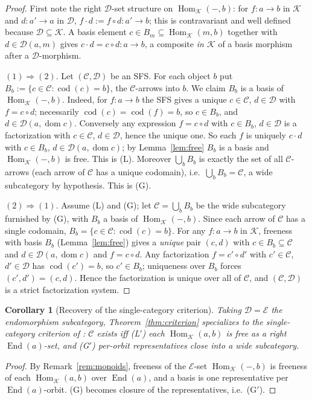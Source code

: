 \documentclass[11pt]{article}
\newtheorem{corollary}[theorem]{Corollary}
\theoremstyle{definition}
\newcommand{\Hom}{\operatorname{Hom}}
\newcommand{\End}{\operatorname{End}}
\newcommand{\C}{\mathcal{C}}
\newcommand{\D}{\mathcal{D}}
\newcommand{\K}{\mathcal{K}}
\newcommand{\E}{\mathcal{E}}
\newcommand{\dom}{\operatorname{dom}}
\newcommand{\cod}{\operatorname{cod}}
\begin{document}
\begin{proof}
First note the right $\D$-set structure on $\Hom_\K(-,b)$: for $f:a\to b$ in $\K$
and $d:a'\to a$ in $\D$, $f\cdot d:=f\circ d:a'\to b$; this is contravariant and
well defined because $\D\subseteq\K$. A basis element $c\in B_m\subseteq
\Hom_\K(m,b)$ together with $d\in\D(a,m)$ gives $c\cdot d=c\circ d:a\to b$, a
composite \emph{in $\K$} of a basis morphism after a $\D$-morphism.

$(1)\Rightarrow(2)$. Let $(\C,\D)$ be an SFS. For each object $b$ put
$B_b:=\{c\in\C:\cod(c)=b\}$, the $\C$-arrows into $b$. We claim $B_b$ is a basis of
$\Hom_\K(-,b)$. Indeed, for $f:a\to b$ the SFS gives a unique $c\in\C$, $d\in\D$
with $f=c\circ d$; necessarily $\cod(c)=\cod(f)=b$, so $c\in B_b$, and
$d\in\D(a,\dom c)$. Conversely any expression $f=c\circ d$ with $c\in B_b$,
$d\in\D$ is a factorization with $c\in\C$, $d\in\D$, hence the unique one. So each
$f$ is uniquely $c\cdot d$ with $c\in B_b$, $d\in\D(a,\dom c)$; by
Lemma~\ref{lem:free} $B_b$ is a basis and $\Hom_\K(-,b)$ is free. This is (L).
Moreover $\bigcup_b B_b$ is exactly the set of all $\C$-arrows (each arrow of $\C$
has a unique codomain), i.e.\ $\bigcup_b B_b=\C$, a wide subcategory by
hypothesis. This is (G).

$(2)\Rightarrow(1)$. Assume (L) and (G); let $\C=\bigcup_b B_b$ be the wide
subcategory furnished by (G), with $B_b$ a basis of $\Hom_\K(-,b)$. Since each
arrow of $\C$ has a single codomain, $B_b=\{c\in\C:\cod(c)=b\}$. For any
$f:a\to b$ in $\K$, freeness with basis $B_b$ (Lemma~\ref{lem:free}) gives a
\emph{unique} pair $(c,d)$ with $c\in B_b\subseteq\C$ and $d\in\D(a,\dom c)$ and
$f=c\circ d$. Any factorization $f=c'\circ d'$ with $c'\in\C$, $d'\in\D$ has
$\cod(c')=b$, so $c'\in B_b$; uniqueness over $B_b$ forces $(c',d')=(c,d)$. Hence
the factorization is unique over all of $\C$, and $(\C,\D)$ is a strict
factorization system.
\end{proof}

\begin{corollary}[Recovery of the single-category criterion]\label{cor:single}
Taking $\D=\E$ the endomorphism subcategory, Theorem~\ref{thm:criterion}
specializes to the single-category criterion of \cite{single}: $\C$ exists iff
(L$'$) each $\Hom_\K(a,b)$ is free as a right $\End(a)$-set, and (G$'$) per-orbit
representatives close into a wide subcategory.
\end{corollary}

\begin{proof}
By Remark~\ref{rem:monoids}, freeness of the $\E$-set $\Hom_\K(-,b)$ is freeness
of each $\Hom_\K(a,b)$ over $\End(a)$, and a basis is one representative per
$\End(a)$-orbit. (G) becomes closure of the representatives, i.e.\ (G$'$).
\end{proof}
\end{document}
